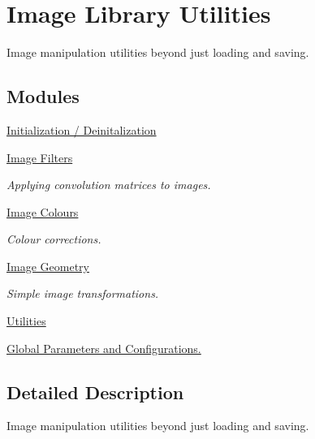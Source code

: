 \hypertarget{group___i_l_u}{\section{Image Library Utilities}
\label{group___i_l_u}
}


Image manipulation utilities beyond just loading and saving.  


\subsection*{Modules}
\begin{DoxyCompactItemize}
\item 
\hyperlink{group__ilu__setup}{Initialization / Deinitalization}
\item 
\hyperlink{group__ilu__filter}{Image Filters}
\begin{DoxyCompactList}\small\item\em Applying convolution matrices to images. \end{DoxyCompactList}\item 
\hyperlink{group__ilu__colour}{Image Colours}
\begin{DoxyCompactList}\small\item\em Colour corrections. \end{DoxyCompactList}\item 
\hyperlink{group__ilu__geometry}{Image Geometry}
\begin{DoxyCompactList}\small\item\em Simple image transformations. \end{DoxyCompactList}\item 
\hyperlink{group__ilu__util}{Utilities}
\item 
\hyperlink{group__ilu__state}{Global Parameters and Configurations.}
\end{DoxyCompactItemize}


\subsection{Detailed Description}
Image manipulation utilities beyond just loading and saving. 


